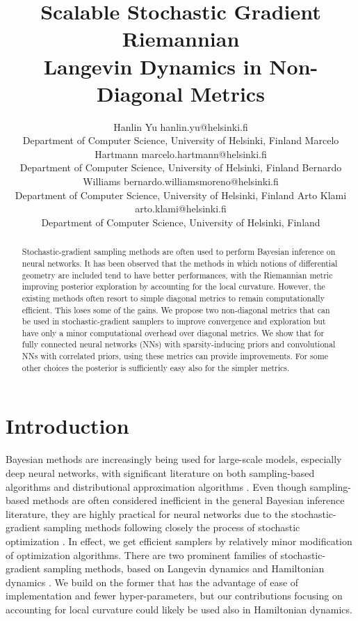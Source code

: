 \documentclass[10pt]{article} %
\title{Scalable Stochastic Gradient Riemannian \\ Langevin Dynamics in Non-Diagonal Metrics}
\author{\name Hanlin Yu \email hanlin.yu@helsinki.fi \\
      \addr Department of Computer Science,
      University of Helsinki, Finland
      \AND
      \name Marcelo Hartmann \email marcelo.hartmann@helsinki.fi \\
      \addr Department of Computer Science,
      University of Helsinki, Finland
      \AND
      \name Bernardo Williams \email bernardo.williamsmoreno@helsinki.fi \\
      \addr Department of Computer Science,
      University of Helsinki, Finland
      \AND
      \name Arto Klami \email arto.klami@helsinki.fi \\
      \addr Department of Computer Science,
      University of Helsinki, Finland
      }
\theoremstyle{plain}
\theoremstyle{definition}
\theoremstyle{remark}
\begin{document}
\maketitle

\begin{abstract}
Stochastic-gradient sampling methods are often used to perform Bayesian inference on neural networks. It has been observed that the methods in which notions of differential geometry are included tend to have better performances, with the Riemannian metric improving posterior exploration by accounting for the local curvature. However, the existing methods often resort to simple diagonal metrics to remain computationally efficient. This loses some of the gains. We propose two non-diagonal metrics that can be used in stochastic-gradient samplers to improve convergence and exploration but have only a minor computational overhead over diagonal metrics. We show that for fully connected neural networks (NNs) with sparsity-inducing priors and convolutional NNs with correlated priors, using these metrics can provide improvements. For some other choices the posterior is sufficiently easy also for the simpler metrics.
\end{abstract}

\section{Introduction}
\label{sec:intro}

Bayesian methods are increasingly being used for large-scale models, especially deep neural networks, with significant literature on both sampling-based algorithms \citep{Welling2011,Chen2014,Zhang2020,Vono2022} and distributional approximation algorithms \citep{Graves2011,Blundell2015,Huix2022,Nazaret2022}. Even though sampling-based methods are often considered inefficient in the general Bayesian inference literature, they are highly practical for neural networks due to the stochastic-gradient sampling methods following closely the process of stochastic optimization \citep{Wenzel2020}. In effect, we get efficient samplers by relatively minor modification of optimization algorithms. 
There are two prominent families of stochastic-gradient sampling methods, based on Langevin dynamics \citep{Welling2011} and Hamiltonian dynamics \citep{Chen2014}. We build on the former that has the advantage of ease of implementation and fewer hyper-parameters, but our contributions focusing on accounting for local curvature could likely be used also in Hamiltonian dynamics.
\end{document}
